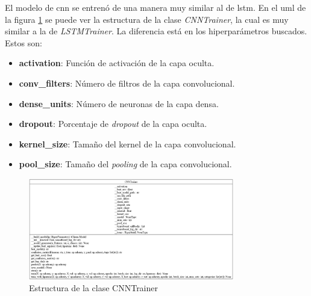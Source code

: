 El modelo de \gls{cnn} se entrenó de una manera muy similar al de \gls{lstm}. En el uml de la figura \ref{fig:cnn-estructura} se puede ver la estructura de la clase \textit{CNNTrainer}, la cual es muy similar a la de \textit{LSTMTrainer}. La diferencia está en los hiperparámetros buscados. Estos son:
\begin{itemize}
    \item \textbf{activation}: Función de activación de la capa oculta.
    \item \textbf{conv\_filters}: Número de filtros de la capa convolucional.
    \item \textbf{dense\_units}: Número de neuronas de la capa densa.
    \item \textbf{dropout}: Porcentaje de \textit{dropout} de la capa oculta.
    \item \textbf{kernel\_size}: Tamaño del kernel de la capa convolucional.
    \item \textbf{pool\_size}: Tamaño del \textit{pooling} de la capa convolucional.
\end{itemize}

\begin{figure}[h!]
    \centering
    \includegraphics[width=0.8\textwidth]{Imagenes/Bitmap/classes_CNNTrainer.png}
    \caption{Estructura de la clase CNNTrainer}
    \label{fig:cnn-estructura}
\end{figure}

